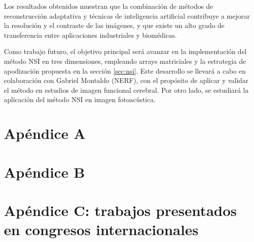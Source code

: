 \documentclass[10pt,a4paper]{article}
\begin{document}
Los resultados obtenidos muestran que la combinación de métodos de reconstrucción adaptativa y técnicas de inteligencia artificial contribuye a mejorar la resolución y el contraste de las imágenes, y que existe un alto grado de transferencia entre aplicaciones industriales y biomédicas.

Como trabajo futuro, el objetivo principal será avanzar en la implementación del método NSI en tres dimensiones, empleando arrays matriciales y la estrategia de apodización propuesta en la sección \ref{sec:nsi}. Este desarrollo se llevará a cabo en colaboración con Gabriel Montaldo (NERF), con el propósito de aplicar y validar el método en estudios de imagen funcional cerebral. Por otro lado, se estudiará la aplicación del método NSI en imagen fotoacústica.


\printbibliography

\appendix
\newpage
\section{Apéndice A}


\section{Apéndice B}


\section{Apéndice C: trabajos presentados en congresos internacionales}









%
%
%
%
%
%
%
%
%
%
\end{document}
